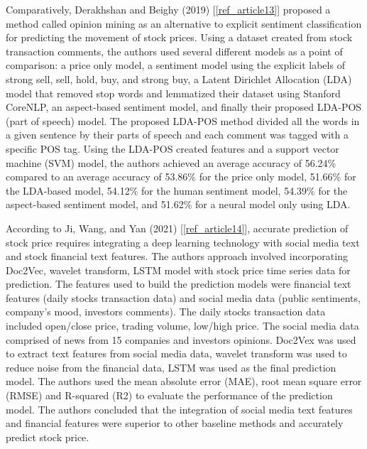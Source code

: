 \documentclass{llncs}
\begin{document}
Comparatively, Derakhshan and Beighy (2019) [\ref{ref_article13}] proposed a method called opinion mining as an alternative to explicit sentiment classification for predicting the movement of stock prices. Using a dataset created from stock transaction comments, the authors used several different models as a point of comparison: a price only model, a sentiment model using the explicit labels of strong sell, sell, hold, buy, and strong buy, a Latent Dirichlet Allocation (LDA) model that removed stop words and lemmatized their dataset using Stanford CoreNLP, an aspect-based sentiment model, and finally their proposed LDA-POS (part of speech) model. The proposed LDA-POS method divided all the words in a given sentence by their parts of speech and each comment was tagged with a specific POS tag. Using the LDA-POS created features and a support vector machine (SVM) model, the authors achieved an average accuracy of 56.24\% compared to an average accuracy of 53.86\% for the price only model, 51.66\% for the LDA-based model, 54.12\% for the human sentiment model, 54.39\% for the aspect-based sentiment model, and  51.62\% for a neural model only using LDA.  

According to Ji, Wang, and Yan (2021) [\ref{ref_article14}], accurate prediction of stock price requires integrating a deep learning technology with social media text and stock financial text features. The authors approach involved incorporating Doc2Vec, wavelet transform, LSTM model with stock price time series data for prediction. The features used to build the prediction models were financial text features (daily stocks transaction data) and social media data (public sentiments, company’s mood, investors comments). The daily stocks transaction data included open/close price, trading volume, low/high price. The social media data comprised of news from 15 companies and investors opinions. Doc2Vex was used to extract text features from social media data, wavelet transform was used to reduce noise from the financial data, LSTM was used as the final prediction model. The authors used the mean absolute error (MAE), root mean square error (RMSE) and R-squared (R2) to evaluate the performance of the prediction model. The authors concluded that the integration of social media text features and financial features were superior to other baseline methods and accurately predict stock price.
\end{document}
